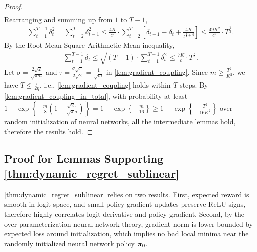 \begin{proof}
\begin{equation}
\begin{split}
\end{split}
\end{equation}
Rearranging and summing up from $1$ to $T-1$,
\begin{equation*}
\begin{split}
    \sum\limits_{t=1}^{T-1}{\delta_{t}^2} = \sum\limits_{t=2}^{T}{\delta_{t-1}^2} \le \frac{4 K}{ c^2} \cdot  \sum\limits_{t=2}^{T} { \left[ \delta_{t-1} - \delta_t + \frac{ 4 K }{t^{\frac{2}{3} + \beta}} \right] } \le \frac{49 K^2}{ c^2} \cdot T^{\frac{1}{3}}.
\end{split}
\end{equation*}
By the Root-Mean Square-Arithmetic Mean inequality,
\begin{equation*}
\begin{split}
    \sum\limits_{t=1}^{T-1}{\delta_{t}} \le \sqrt{\left(T  - 1 \right) \cdot \sum\limits_{t=1}^{T-1}{\delta_{t}^2}} \le \frac{7 K}{c} \cdot  T^{\frac{2}{3}}.
\end{split}
\end{equation*}
Let $\sigma = \frac{2 \sqrt{2}}{\sqrt{\pi m}}$ and $\tau = \frac{\sigma \sqrt{\pi}}{2 \sqrt{2}} = \frac{1}{\sqrt{m}}$ in \cref{lem:gradient_coupling}. Since $m \ge \frac{T^2}{K^2}$, we have $T \le \frac{\tau}{2 \eta}$, i.e., \cref{lem:gradient_coupling} holds within $T$ steps. By \cref{lem:gradient_coupling_in_total}, with probability at least $1 - \exp\left\{ - \frac{m}{8} ( 1 - \frac{\sqrt{2}\tau}{\sqrt{\pi}\sigma} ) \right\} = 1 - \exp\left\{ - \frac{m}{16} \right\} \ge 1 - \exp\left\{ - \frac{T^2}{16 K^2} \right\}$ over random initialization of neural networks, all the intermediate lemmas hold, therefore the results hold.
\end{proof}

\subsection{Proof for Lemmas Supporting \cref{thm:dynamic_regret_sublinear}}

\cref{thm:dynamic_regret_sublinear} relies on two results. First, expected reward is smooth in logit space, and small policy gradient updates preserve ReLU signs, therefore highly correlates logit derivative and policy gradient. Second, by the over-parameterization neural network theory, gradient norm is lower bounded by expected loss around initialization, which implies no bad local minima near the randomly initialized neural network policy ${\boldsymbol{\pi}}_0$.

